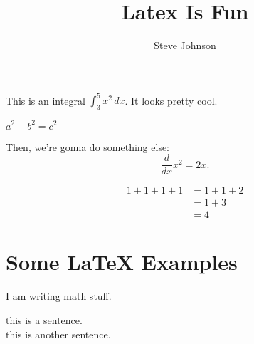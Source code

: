 \documentclass[12pt]{article}
\title{Latex Is Fun}
\author{Steve Johnson}
\begin{document}


This is an integral $\displaystyle\int^5_3 x^2 \, dx$. It looks pretty cool.

\bigskip

\( a^2 + b^2 = c^2 \)

Then, we're gonna do something else:
\[ \frac{d}{dx} x^2 = 2x.\]

\begin{align}
1+1+1+1 &= 1+1+2 \\
&=1+3\\
&=4
\end{align}


\section{Some \LaTeX{} Examples}


\begin{center}
I am writing math stuff.
\end{center}

this is a sentence. \\
this is another sentence.
\end{document}
